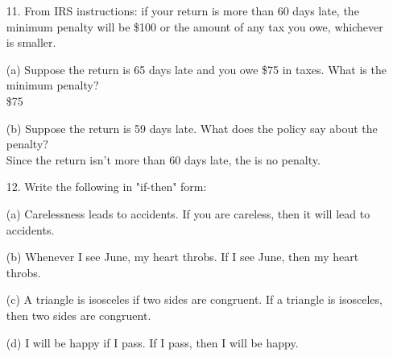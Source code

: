 \documentclass{article}
\begin{document}
\begin{itemize}
    (a) Suppose the recomputed premium is \$800 while the premium on the declaration page is \$600.  What must the person do?\\
    {\color{blue} The person must pay the excess (\$200) to Guarantee Auto.}
    
    (b) Suppose the recomputed premium is \$550 while the premium on the declaration page is \$600.  What does the policy statement indicate that the insured person must do?\\
    {\color{blue} Since the recomputed amount doesn't exceed the premium on the declaration page, then the person doesn't need to do anything.}
    
    \item[11.] From IRS instructions: if your return is more than 60 days late, the minimum penalty will be \$100 or the amount of any tax you owe, whichever is smaller.
    
    (a) Suppose the return is 65 days late and you owe \$75 in taxes.  What is the minimum penalty?\\
    {\color{blue} \$75}
    
    (b) Suppose the return is 59 days late.  What does the policy say about the penalty?\\
    {\color{blue} Since the return isn't more than 60 days late, the is no penalty.}
    
    \item[12.] Write the following in "if-then" form:
    
    (a) Carelessness leads to accidents. {\color{blue} If you are careless, then it will lead to accidents.}
    
    (b) Whenever I see June, my heart throbs. {\color{blue} If I see June, then my heart throbs.}
    
    (c) A triangle is isosceles if two sides are congruent. {\color{blue} If a triangle is isosceles, then two sides are congruent.}
    
    (d) I will be happy if I pass. {\color{blue} If I pass, then I will be happy.}
    
\end{itemize}
\end{document}
